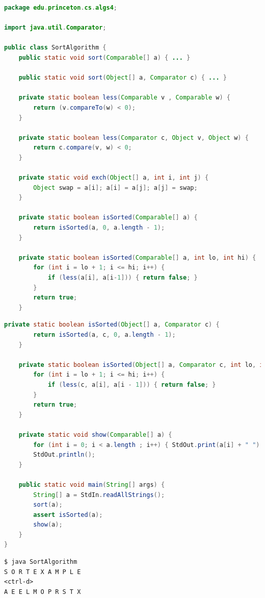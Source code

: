 \documentclass[8pt,a4paper,compress]{beamer}
\begin{document}
\begin{frame}[fragile]
\pause

\begin{lstlisting}[language=Java]
package edu.princeton.cs.algs4;

import java.util.Comparator;

public class SortAlgorithm {
    public static void sort(Comparable[] a) { ... }
    
    public static void sort(Object[] a, Comparator c) { ... }

    private static boolean less(Comparable v , Comparable w) {
        return (v.compareTo(w) < 0);
    }

    private static boolean less(Comparator c, Object v, Object w) {
        return c.compare(v, w) < 0;
    }
        
    private static void exch(Object[] a, int i, int j) {
        Object swap = a[i]; a[i] = a[j]; a[j] = swap;
    }
    
    private static boolean isSorted(Comparable[] a) {
        return isSorted(a, 0, a.length - 1);
    }

    private static boolean isSorted(Comparable[] a, int lo, int hi) {
        for (int i = lo + 1; i <= hi; i++) {
            if (less(a[i], a[i-1])) { return false; }
        }
        return true;
    }
\end{lstlisting}
\end{frame}

\begin{frame}[fragile]
\pause

\begin{lstlisting}[language=Java]
    private static boolean isSorted(Object[] a, Comparator c) {
        return isSorted(a, c, 0, a.length - 1);
    }

    private static boolean isSorted(Object[] a, Comparator c, int lo, int hi) {
        for (int i = lo + 1; i <= hi; i++) {
            if (less(c, a[i], a[i - 1])) { return false; }
        }
        return true;
    }
    
    private static void show(Comparable[] a) {
        for (int i = 0; i < a.length ; i++) { StdOut.print(a[i] + " "); }
        StdOut.println();
    }
    
    public static void main(String[] args) {
        String[] a = StdIn.readAllStrings();
        sort(a);
        assert isSorted(a);
        show(a);
    }
}
\end{lstlisting}

\pause

\begin{lstlisting}[language={}]
$ java SortAlgorithm
S O R T E X A M P L E
<ctrl-d>
A E E L M O P R S T X
\end{lstlisting}
\end{frame}
\end{document}
